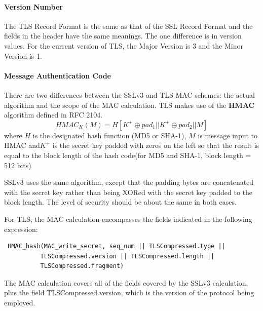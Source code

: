 \documentclass[12pt]{article}
\begin{document}
\paragraph*{Version Number}
The TLS Record Format is the same as that of the SSL Record Format and the fields in the header have the same meanings. The one difference is in version values. For the current version of TLS, the Major Version is 3 and the Minor Version is 1.
\paragraph*{Message Authentication Code}
There are two differences between the SSLv3 and TLS MAC schemes: the actual algorithm and the scope of the MAC calculation. TLS makes use of the \textbf{HMAC} algorithm defined in RFC 2104. 
$$ HMAC_K(M) = H[K^+ \oplus pad_1 || K^+ \oplus pad_2 || M]$$ where $H$ is the designated hash function (MD5 or SHA-1), $M$ is  message input to HMAC and$K^+$ is the
secret key padded with zeros on the left so that the result is equal to the block length of the hash code(for MD5 and SHA-1, block length = 512 bits)

SSLv3 uses the same algorithm, except that the padding bytes are concatenated with the secret key rather than being XORed with the secret key padded to the block length. The level of security should be about the same in both cases.

For TLS, the MAC calculation encompasses the fields indicated in the following expression:

\begin{verbatim}
 HMAC_hash(MAC_write_secret, seq_num || TLSCompressed.type ||
          TLSCompressed.version || TLSCompressed.length ||
          TLSCompressed.fragment)       
\end{verbatim}
The MAC calculation covers all of the fields covered by the SSLv3 calculation, plus the field TLSCompressed.version, which is the version of the protocol being employed.
\end{document}
